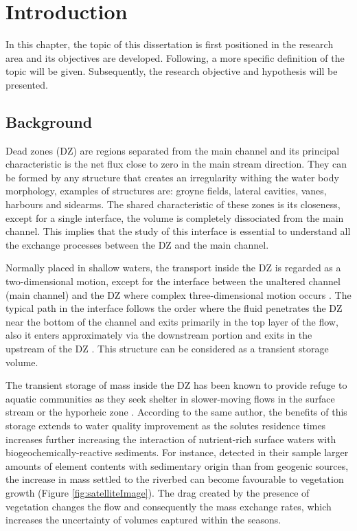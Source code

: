\chapter{Introduction}
\label{chap:introduction}
In this chapter, the topic of this dissertation is first positioned in the research area and its objectives are developed. Following, a more specific definition of the topic will be given. Subsequently, the research objective and hypothesis will be presented.
\section{Background}
Dead zones (DZ) are regions separated from the main channel and its principal characteristic is the net flux close to zero in the main stream direction. They can be formed by any structure that creates an irregularity withing the water body morphology, examples of structures are: groyne fields, lateral cavities, vanes, harbours and sidearms. The shared characteristic of these zones is its closeness, except for a single interface, the volume is completely dissociated from the main channel. This implies that the study of this interface is essential to understand all the exchange processes between the DZ and the main channel.

Normally placed in shallow waters, the transport inside the DZ is regarded as a two-dimensional motion, except for the interface between the unaltered channel (main channel) and the DZ where complex three-dimensional motion occurs \cite{xiang2020}. The typical path in the interface follows the order where the fluid penetrates the DZ near the bottom of the channel and exits primarily in the top layer of the flow, also it enters approximately via the downstream portion and exits in the upstream of the DZ \cite{weitbrecht2004,xiang2020}. This structure can be considered as a transient storage volume.

The transient storage of mass inside the DZ has been known to provide refuge to aquatic communities as they seek shelter in slower-moving flows in the surface stream or the hyporheic zone \cite{jackson2013}. According to the same author, the benefits of this storage extends to water quality improvement as the solutes residence times increases further increasing the interaction of nutrient-rich surface waters with biogeochemically-reactive sediments. For instance, \textcite{SchwartzKozerski2003} detected in their sample larger amounts of element contents with sedimentary origin than from geogenic sources, the increase in mass settled to the riverbed can become favourable to vegetation growth (Figure \ref{fig:satelliteImage}). The drag created by the presence of vegetation changes the flow and consequently the mass exchange rates, which increases the uncertainty of volumes captured within the seasons.

